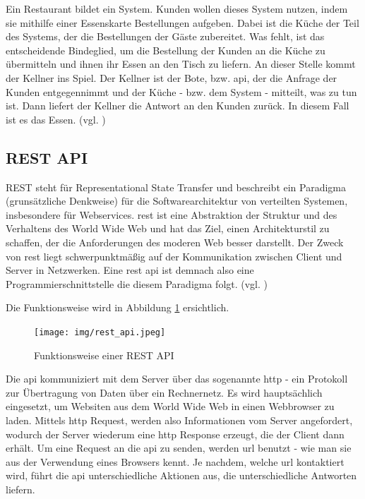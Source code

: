 \documentclass[oneside]{ausarbeitung}
\begin{document}
Ein Restaurant bildet ein System. Kunden wollen dieses System nutzen,
indem sie mithilfe einer Essenskarte Bestellungen aufgeben. Dabei ist
die Küche der Teil des Systems, der die Bestellungen der Gäste
zubereitet. Was fehlt, ist das entscheidende Bindeglied, um die
Bestellung der Kunden an die Küche zu übermitteln und ihnen ihr
Essen an den Tisch zu liefern. An dieser Stelle kommt der Kellner ins
Spiel. Der Kellner ist der Bote, bzw. \ac{api}, der die Anfrage der
Kunden entgegennimmt und der Küche - bzw. dem System - mitteilt, was
zu tun ist. Dann liefert der Kellner die Antwort an den Kunden
zurück. In diesem Fall ist es das Essen. (vgl. \cite{api_example})    

\subsection{REST API}
\label{sub:rest_api}
REST steht für Representational State Transfer und beschreibt ein
Paradigma (grunsätzliche Denkweise) für die Softwarearchitektur von
verteilten Systemen, insbesondere für Webservices. \ac{rest} ist eine
Abstraktion der Struktur und des Verhaltens des World Wide Web und hat
das Ziel, einen Architekturstil zu schaffen, der die Anforderungen des
moderen Web besser darstellt. Der Zweck von \ac{rest} liegt
schwerpunktmäßig auf der Kommunikation zwischen Client und Server in
Netzwerken. Eine \ac{rest} \ac{api} ist demnach also eine
Programmierschnittstelle die diesem Paradigma folgt. (vgl.
\cite{rest})

Die Funktionsweise wird in Abbildung \ref{fig:5} ersichtlich.

\begin{figure}[H]
  \centering
  \texttt{[image: img/rest\_api.jpeg]}
  \caption{Funktionsweise einer REST API\cite{rest_pic}}
  \label{fig:5}
\end{figure}

Die \ac{api} kommuniziert mit dem Server über das sogenannte
\ac{http} - ein Protokoll zur Übertragung von Daten über ein
Rechnernetz. Es wird hauptsächlich eingesetzt, um Websiten aus dem
World Wide Web in einen Webbrowser zu laden\cite{http_definition}.
Mittels \ac{http} Request, werden also Informationen vom Server
angefordert, wodurch der Server wiederum eine \ac{http} Response
erzeugt, die der Client dann erhält. Um eine Request an die
\ac{api} zu senden, werden \ac{url} benutzt - wie man sie aus der 
Verwendung eines Browsers kennt. Je nachdem, welche \ac{url} kontaktiert
wird, führt die \ac{api} unterschiedliche Aktionen aus, die 
unterschiedliche Antworten liefern.
\end{document}
